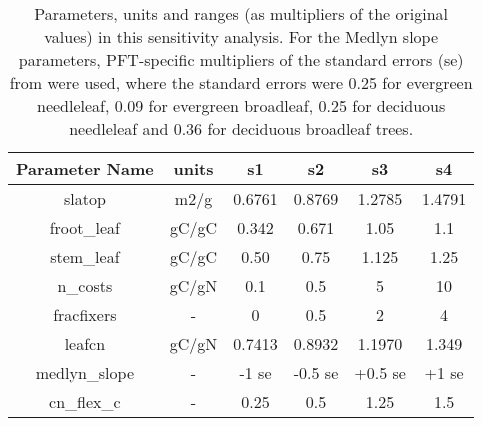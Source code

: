 \documentclass[draft,linenumbers]{agujournal}
\begin{document}
\begin{table}
\begin{center}
\begin{tabular}{ |c|c|c|c|c|c| } 
 \hline
 Parameter Name & units & s1 &s2 & s3 & s4\\
  \hline
 slatop & m2/g & 0.6761 & 0.8769 &1.2785 &1.4791\\ 
 froot\_leaf & gC/gC &  0.342 &0.671 &1.05 & 1.1\\
 stem\_leaf  & gC/gC & 0.50 &0.75 &1.125 &1.25\\
 n\_costs    & gC/gN &0.1 &0.5&  5& 10\\
 fracfixers  & - & 0 &0.5 & 2 & 4 \\
 leafcn  & gC/gN &0.7413 & 0.8932 & 1.1970  & 1.349\\
 medlyn\_slope  &- &-1 se & -0.5 se & +0.5 se  & +1 se\\
 cn\_flex\_c &-&0.25 & 0.5 & 1.25 & 1.5\\
\hline
\end{tabular}
\end{center}
\caption{Parameters, units and ranges (as multipliers of the original values) in this sensitivity analysis. For the Medlyn slope parameters, PFT-specific multipliers of the standard errors (se) from \cite{dekauwe2014} were used, where the standard errors were 0.25 for evergreen needleleaf, 0.09 for evergreen broadleaf, 0.25 for deciduous needleleaf and 0.36 for deciduous broadleaf trees. }
\label{table_ranges}
\end{table}
\end{document}
